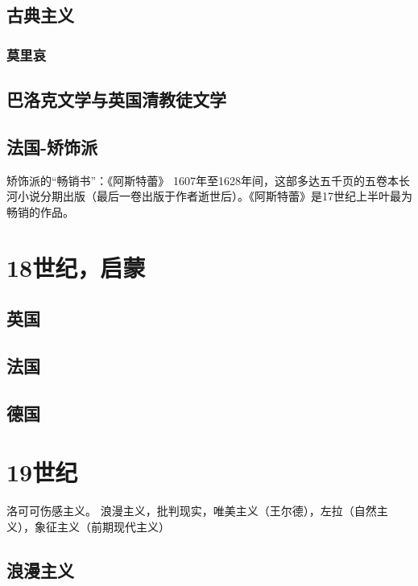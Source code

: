\documentclass[UTF8]{../../RepresentationUniverse}
\begin{document}
\section{古典主义}

\subsection{莫里哀}

\section{巴洛克文学与英国清教徒文学}


\section{法国-矫饰派}


矫饰派的“畅销书”：《阿斯特蕾》
1607年至1628年间，这部多达五千页的五卷本长河小说分期出版（最后一卷出版于作者逝世后）。《阿斯特蕾》是17世纪上半叶最为畅销的作品。


\chapter{18世纪，启蒙}


\section{英国}

\section{法国}

\section{德国}



\chapter{19世纪}

洛可可伤感主义。
浪漫主义，批判现实，唯美主义（王尔德），左拉（自然主义），象征主义（前期现代主义）


\section{浪漫主义}
\end{document}
